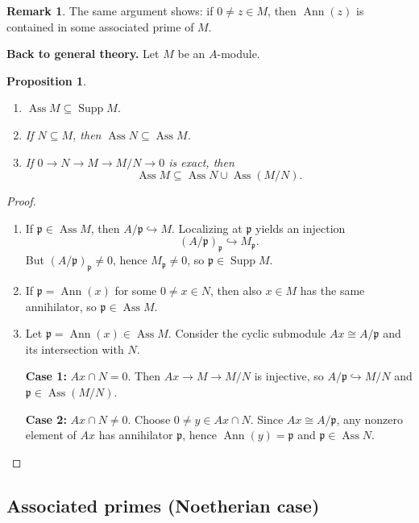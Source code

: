 \documentclass[11pt,a4paper]{article}
\theoremstyle{definition}
\newtheorem{remark}[definition]{Remark}
\theoremstyle{plain}
\newtheorem{proposition}[definition]{Proposition}
\theoremstyle{remark}
\newcommand{\Ann}{\operatorname{Ann}}
\newcommand{\Supp}{\operatorname{Supp}}
\newcommand{\Ass}{\operatorname{Ass}}
\begin{document}
\begin{remark}
The same argument shows: if $0\neq z\in M$, then $\Ann(z)$ is contained in some associated prime of $M$.
\end{remark}

\textbf{Back to general theory.} Let $M$ be an $A$-module.

\begin{proposition}
\begin{enumerate}
\item $\Ass M \subseteq \Supp M$.
\item If $N\subseteq M$, then $\Ass N \subseteq \Ass M$.
\item If $0\to N\to M\to M/N\to 0$ is exact, then
\[
\Ass M \subseteq \Ass N \cup \Ass(M/N).
\]
\end{enumerate}
\end{proposition}

\begin{proof}
\begin{enumerate}
\item If $\mathfrak p\in\Ass M$, then $A/\mathfrak p\hookrightarrow M$.
Localizing at $\mathfrak p$ yields an injection
\[
(A/\mathfrak p)_{\mathfrak p}\hookrightarrow M_{\mathfrak p}.
\]
But $(A/\mathfrak p)_{\mathfrak p}\neq 0$, hence $M_{\mathfrak p}\neq 0$, so $\mathfrak p\in\Supp M$.

\item If $\mathfrak p=\Ann(x)$ for some $0\neq x\in N$, then also $x\in M$ has the same annihilator, so $\mathfrak p\in\Ass M$.

\item Let $\mathfrak p=\Ann(x)\in\Ass M$. Consider the cyclic submodule $Ax\cong A/\mathfrak p$ and its intersection with $N$.

\textbf{Case 1:} $Ax\cap N=0$. Then $Ax\to M\to M/N$ is injective, so $A/\mathfrak p\hookrightarrow M/N$ and $\mathfrak p\in\Ass(M/N)$.

\textbf{Case 2:} $Ax\cap N\neq 0$. Choose $0\neq y\in Ax\cap N$.
Since $Ax\cong A/\mathfrak p$, any nonzero element of $Ax$ has annihilator $\mathfrak p$, hence $\Ann(y)=\mathfrak p$ and $\mathfrak p\in\Ass N$.
\end{enumerate}
\end{proof}

\subsection*{Associated primes (Noetherian case)}
\end{document}
